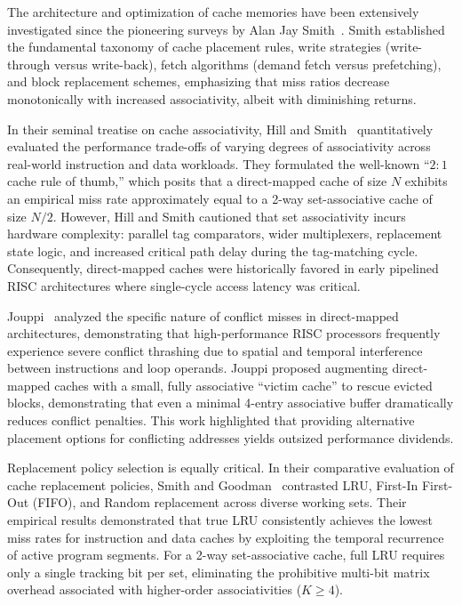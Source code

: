 \documentclass[conference]{IEEEtran}
\begin{document}
The architecture and optimization of cache memories have been extensively investigated since the pioneering surveys by Alan Jay Smith~\cite{smith1982cache}. Smith established the fundamental taxonomy of cache placement rules, write strategies (write-through versus write-back), fetch algorithms (demand fetch versus prefetching), and block replacement schemes, emphasizing that miss ratios decrease monotonically with increased associativity, albeit with diminishing returns.

In their seminal treatise on cache associativity, Hill and Smith~\cite{hill1989evaluating} quantitatively evaluated the performance trade-offs of varying degrees of associativity across real-world instruction and data workloads. They formulated the well-known ``$2:1$ cache rule of thumb,'' which posits that a direct-mapped cache of size $N$ exhibits an empirical miss rate approximately equal to a 2-way set-associative cache of size $N/2$. However, Hill and Smith cautioned that set associativity incurs hardware complexity: parallel tag comparators, wider multiplexers, replacement state logic, and increased critical path delay during the tag-matching cycle. Consequently, direct-mapped caches were historically favored in early pipelined RISC architectures where single-cycle access latency was critical.

Jouppi~\cite{jouppi1990improving} analyzed the specific nature of conflict misses in direct-mapped architectures, demonstrating that high-performance RISC processors frequently experience severe conflict thrashing due to spatial and temporal interference between instructions and loop operands. Jouppi proposed augmenting direct-mapped caches with a small, fully associative ``victim cache'' to rescue evicted blocks, demonstrating that even a minimal 4-entry associative buffer dramatically reduces conflict penalties. This work highlighted that providing alternative placement options for conflicting addresses yields outsized performance dividends.

Replacement policy selection is equally critical. In their comparative evaluation of cache replacement policies, Smith and Goodman~\cite{smith1983instruction} contrasted LRU, First-In First-Out (FIFO), and Random replacement across diverse working sets. Their empirical results demonstrated that true LRU consistently achieves the lowest miss rates for instruction and data caches by exploiting the temporal recurrence of active program segments. For a 2-way set-associative cache, full LRU requires only a single tracking bit per set, eliminating the prohibitive multi-bit matrix overhead associated with higher-order associativities ($K \ge 4$).
\end{document}
